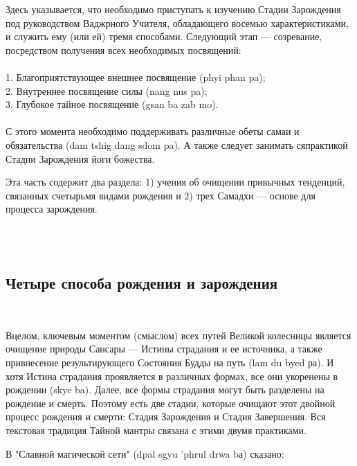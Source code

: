 Здесь указывается, что необходимо приступать к изучению Стадии Зарождения под
руководством Ваджрного Учителя, обладающего восемью характеристиками, и служить ему
(или ей) тремя способами. Следующий этап — созревание, посред\-ством получения всех
необходимых посвящений:\\
\\
1.  Благоприятствующее внешнее посвящение (phyi phan pa);\\
2.  Внутреннее посвящение силы (nang nus pa);\\
3.  Глубокое тайное посвящение (gsan ba zab mo).\\
\\
С этого момента необходимо поддерживать различные обеты самаи и обязательства
(dam tshig dang sdom pa). А также следует занимать сяпрактикой Стадии Зарождения йоги
божества.\\

\begin{siderules}
Эта часть содержит два раздела: 1) учения об очищении привычных тенденций, связанных счетырьмя видами рождения и
2) трех Самадхи — основе для процесса зарождения.
\end{siderules}
\\
\\
\newpage

\subsection{Четыре способа рождения и зарождения}
\\
\begin{siderules}
Вцелом, ключевым моментом (смыслом) всех путей Великой колесницы является очищение
природы Сансары — Истины страдания и ее источника, а также привнесение
результи\-рующего Состояния Будды на путь (lam du byed ра). И хотя Истина страдания
проявляется в различных формах, все они укоренены в рождении (skye ba).
Далее, все формы страдания могут быть разделены на рождение и смерть.
Поэтому есть две стадии, которые очищают этот двойной процесс рождения и смерти:
Стадия Зарождения и Стадия Завершения. Вся текстовая традиция Тайной мантры
связана с этими двумя практиками.
\end{siderules}

В "Славной магической сети" (dpal sgyu 'phrul drwa bа) сказано:

